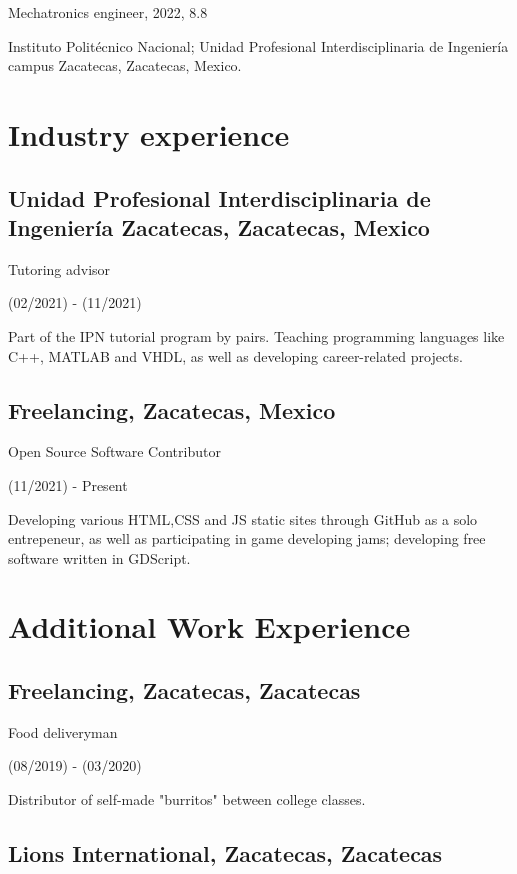 \documentclass{article}
\begin{document}
  Mechatronics engineer, 2022, 8.8

  Instituto Politécnico Nacional; Unidad Profesional Interdisciplinaria de Ingeniería campus Zacatecas, Zacatecas, Mexico.


  \section{Industry experience}

  \subsection{\textbf{Unidad Profesional Interdisciplinaria de Ingeniería Zacatecas}, Zacatecas, Mexico}

  Tutoring advisor

  (02/2021) - (11/2021)

  Part of the IPN tutorial program by pairs. Teaching programming languages like C++, MATLAB and VHDL, as well as developing career-related projects.

  \subsection{\textbf{Freelancing}, Zacatecas, Mexico}

  Open Source Software Contributor

  (11/2021) - Present

  Developing various HTML,CSS and JS static sites through GitHub as a solo entrepeneur, as well as participating in game developing jams; developing free software written in GDScript.


  \section{Additional Work Experience}

  \subsection{\textbf{Freelancing}, Zacatecas, Zacatecas}

  Food deliveryman

  (08/2019) - (03/2020)

  Distributor of self-made "burritos" between college classes.

  \subsection{\textbf{Lions International}, Zacatecas, Zacatecas}
\end{document}

